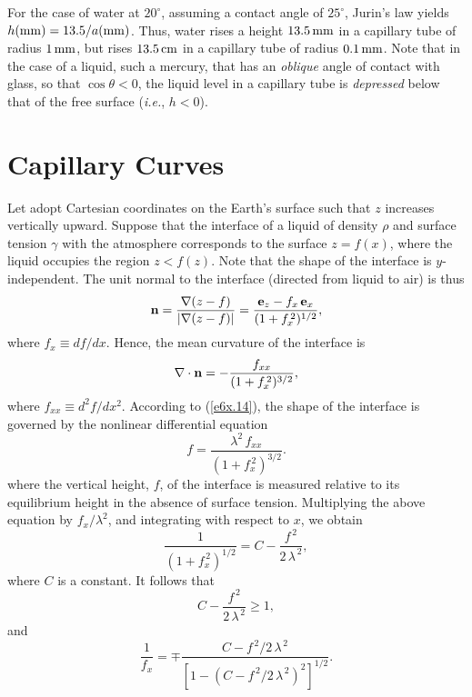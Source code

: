 For the case of water at $20^\circ$, assuming a contact angle of $25^\circ$, Jurin's law yields
$h({\rm mm}) = 13.5/a({\rm mm})$. Thus, water rises a height $13.5\,{\rm mm}$ in a capillary tube of
radius $1\,{\rm mm}$, but rises $13.5\,{\rm cm}$ in a capillary tube of radius $0.1\,{\rm mm}$. 
Note that in the case of a liquid, such a mercury, that has an {\em oblique}\/
angle of contact with glass, so that $\cos\theta<0$, the  liquid level in a capillary tube is {\em depressed}\/
below that of the free surface ({\em i.e.}, $h<0$). 
 
\section{Capillary Curves}
Let adopt Cartesian coordinates on the Earth's surface such that $z$ increases vertically upward. Suppose
that the interface of a liquid of density $\rho$ and surface tension $\gamma$ with the atmosphere corresponds to the
surface $z=f(x)$, where the liquid occupies the region $z<f(z)$. Note that the shape of the interface is $y$-independent. The unit normal to the interface (directed from liquid
to air) is thus 
\begin{equation}
{\bf n} = \frac{\nabla(z-f)}{|\nabla(z-f)|}=\frac{{\bf e}_z - f_x\,{\bf e}_x}{(1+f_x^{\,2})^{1/2}},
\end{equation}
where $f_x\equiv df/dx$. Hence, the mean curvature of the interface is
\begin{equation}
\nabla\cdot {\bf n} = - \frac{f_{xx}}{(1+f_x^{\,2})^{3/2}},
\end{equation}
where $f_{xx}\equiv d^2f/dx^2$. 
According to  (\ref{e6x.14}), the shape of the interface is governed by the nonlinear differential
equation
\begin{equation}
f = \frac{\lambda^2\,f_{xx}}{(1+f_x^{\,2})^{3/2}}.
\end{equation}
where  the vertical height, $f$, of the interface
is measured relative to its equilibrium height in the absence of surface tension. 
Multiplying the above equation by $f_x/\lambda^2$, and integrating with respect to $x$, we obtain
\begin{equation}\label{e6x.27}
 \frac{1}{(1+f_x^{\,2})^{1/2}} = C-\frac{f^{\,2}}{2\,\lambda^{\,2}},
\end{equation}
where $C$ is a constant. It follows that
\begin{equation}\label{e6x.28}
C - \frac{f^{\,2}}{2\,\lambda^{\,2}}\geq 1,
\end{equation}
and
\begin{equation}\label{e6x.29}
\frac{1}{f_x} = \mp \frac{C-f^{\,2}/2\,\lambda^{\,2}}{[1-(C-f^{\,2}/2\,\lambda^{\,2})^2]^{1/2}}.
\end{equation}


